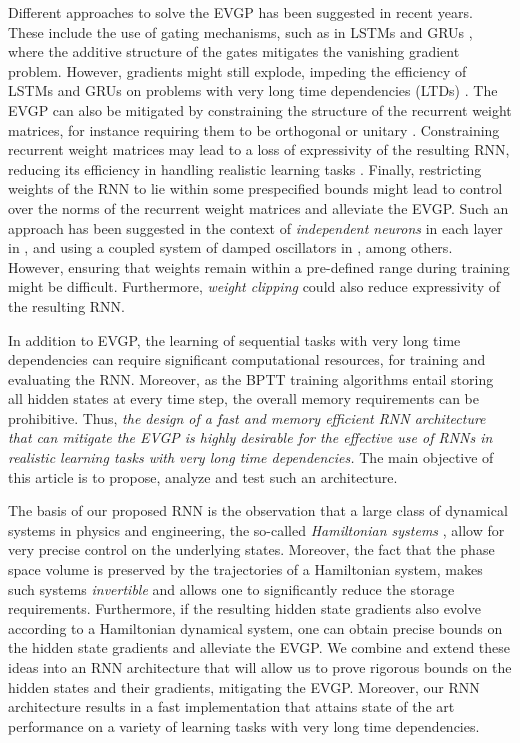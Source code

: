 \documentclass[a4paper]{article}
\begin{document}
Different approaches to solve the EVGP has been suggested in recent years. These include the use of gating mechanisms, such as in LSTMs \cite{lstm} and GRUs \cite{gru}, where the additive structure of the gates mitigates the vanishing gradient problem. However, gradients might still explode, impeding the efficiency of LSTMs and GRUs on problems with very long time dependencies (LTDs) \cite{indrnn}. The EVGP can also be mitigated by constraining the structure of the recurrent weight matrices, for instance requiring them to be orthogonal or unitary \citep{orthornn,urnn,eurnn,nnRNN}. Constraining recurrent weight matrices may lead to a loss of expressivity of the resulting RNN, reducing its efficiency in handling realistic learning tasks \cite{nnRNN}. Finally, restricting weights of the RNN to lie within some prespecified bounds might lead to control over the norms of the recurrent weight matrices and alleviate the EVGP. Such an approach has been suggested in the context of \emph{independent neurons} in each layer in \cite{indrnn}, and using a coupled system of damped oscillators in \cite{coRNN}, among others. However, ensuring that weights remain within a pre-defined range during training might be difficult. Furthermore, \emph{weight clipping} could also reduce expressivity of the resulting RNN. 

In addition to EVGP, the learning of sequential tasks with very long time dependencies can require significant computational resources, for training and evaluating the RNN. Moreover, as the BPTT training algorithms entail storing all hidden states at every time step, the overall memory requirements can be prohibitive. Thus, \emph{the design of a fast and memory efficient RNN architecture that can mitigate the EVGP is highly desirable for the effective use of RNNs in realistic learning tasks with very long time dependencies.} The main objective of this article is to propose, analyze and test such an architecture. 

The basis of our proposed RNN is the observation that a large class of dynamical systems in physics and engineering, the so-called \emph{Hamiltonian systems} \cite{arn1}, allow for very precise control on the underlying states. Moreover, the fact that the phase space volume is preserved by the trajectories of a Hamiltonian system, makes such systems \emph{invertible} and allows one to significantly reduce the storage requirements. Furthermore, if the resulting hidden state gradients also evolve according to a Hamiltonian dynamical system, one can obtain precise bounds on the hidden state gradients and alleviate the EVGP. We combine and extend these ideas into an RNN architecture that will allow us to prove rigorous bounds on the hidden states and their gradients, mitigating the EVGP. Moreover, our RNN architecture results in a fast implementation that attains state of the art performance on a variety of learning tasks with very long time dependencies. 
\end{document}

